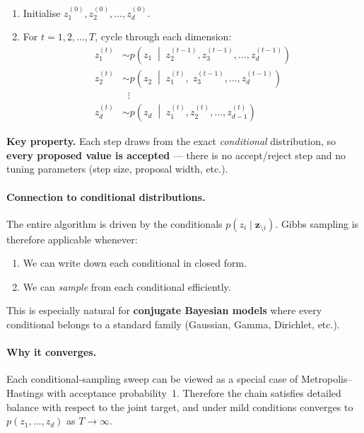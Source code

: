 \documentclass[12pt, a4paper]{article}
\begin{document}
\begin{enumerate}
    \item Initialise $z_1^{(0)}, z_2^{(0)}, \ldots, z_d^{(0)}$.
    \item For $t = 1, 2, \ldots, T$, cycle through each dimension:
    \begin{align}
        z_1^{(t)} &\sim
            p\!\left(z_1 \;\middle|\;
            z_2^{(t-1)}, z_3^{(t-1)}, \ldots, z_d^{(t-1)}\right)
            \label{eq:gibbs_z1} \\
        z_2^{(t)} &\sim
            p\!\left(z_2 \;\middle|\;
            z_1^{(t)},\; z_3^{(t-1)}, \ldots, z_d^{(t-1)}\right)
            \label{eq:gibbs_z2} \\
        &\;\;\vdots \nonumber \\
        z_d^{(t)} &\sim
            p\!\left(z_d \;\middle|\;
            z_1^{(t)}, z_2^{(t)}, \ldots, z_{d-1}^{(t)}\right)
            \label{eq:gibbs_zd}
    \end{align}
\end{enumerate}

\noindent\textbf{Key property.}  Each step draws from the exact
\emph{conditional} distribution, so \textbf{every proposed value is
accepted} --- there is no accept/reject step and no tuning
parameters (step size, proposal width, etc.).

\paragraph{Connection to conditional distributions.}
The entire algorithm is driven by the conditionals
$p(z_i \mid \mathbf{z}_{\setminus i})$.  Gibbs sampling is
therefore applicable whenever:
\begin{enumerate}
    \item We can write down each conditional in closed form.
    \item We can \emph{sample} from each conditional efficiently.
\end{enumerate}
This is especially natural for \textbf{conjugate Bayesian models}
where every conditional belongs to a standard family (Gaussian,
Gamma, Dirichlet, etc.).

\paragraph{Why it converges.}
Each conditional-sampling sweep can be viewed as a special case of
Metropolis--Hastings with acceptance probability~1.  Therefore the
chain satisfies detailed balance with respect to the joint target,
and under mild conditions converges to $p(z_1, \ldots, z_d)$ as
$T \to \infty$.
\end{document}
